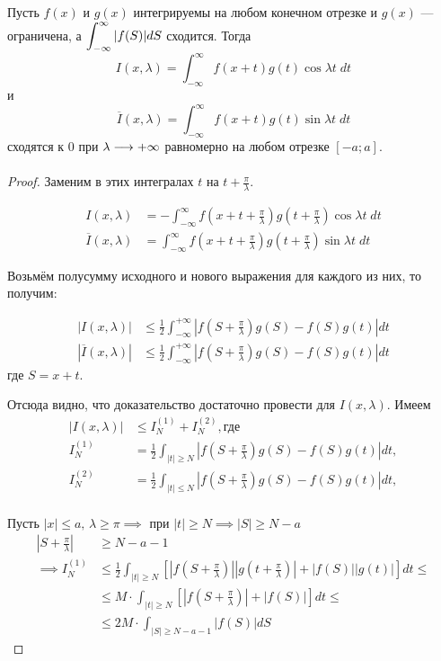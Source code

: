 \begin{theorem}[Лемма 2]
    Пусть $f(x)$ и $g(x)$ интегрируемы на любом конечном отрезке и $g(x)$ ---
    ограничена, а $\displaystyle\int_{-\infty}^\infty |f(S)| dS$ сходится. Тогда 
    \[ I(x, \lambda) = \int_{-\infty}^\infty f(x + t) g(t) \cos \lambda t \; dt \]
    и
    \[ \overline{I}(x, \lambda) = \int_{-\infty}^\infty f(x + t) g(t) \sin \lambda t \; dt \]
    сходятся к 0 при $\lambda \underset{}{\longrightarrow} +\infty$ равномерно на любом отрезке
    $[-a; a]$.
\end{theorem}
\begin{proof}
    Заменим в этих интегралах $t$ на $t + \frac{\pi}{\lambda}$.

    \begin{align*}
        I(x, \lambda) &= -\int_{-\infty}^\infty f(x + t + \frac{\pi}{\lambda}) g(t + \frac{\pi}{\lambda}) \cos \lambda t \; dt \\
        \overline{I}(x, \lambda) &= \int_{-\infty}^\infty f(x + t + \frac{\pi}{\lambda}) g(t + \frac{\pi}{\lambda}) \sin \lambda t \; dt
    \end{align*}

    Возьмём полусумму исходного и нового выражения для каждого из них, то
    получим:

    \begin{align*}
        |I(x, \lambda)| &\leq \frac{1}{2} \int_{-\infty}^{+\infty} \left| f(S + \frac{\pi}{\lambda}) g(S) - f(S)g(t) \right| dt \\
        |\overline{I}(x, \lambda)| &\leq \frac{1}{2} \int_{-\infty}^{+\infty} \left| f(S + \frac{\pi}{\lambda}) g(S) - f(S)g(t) \right| dt
    \end{align*} где $S = x + t$.

    Отсюда видно, что доказательство достаточно провести для $I(x, \lambda)$.
    Имеем \begin{align*}
        |I(x, \lambda)| &\leq I_N^{(1)} + I_N^{(2)}, \text{где} \\
        I_N^{(1)} &= \frac{1}{2} \int_{|t| \geq N} \left|f(S + \frac{\pi}{\lambda})g(S) - f(S)g(t)\right| dt, \\
        I_N^{(2)} &= \frac{1}{2} \int_{|t| \leq N} \left|f(S + \frac{\pi}{\lambda})g(S) - f(S)g(t)\right| dt, \\
    \end{align*}

    Пусть $|x| \leq a, \, \lambda \geq \pi \implies$ при $|t| \geq N \implies
    |S| \geq N - a$ 
    \begin{align*}
        \left| S + \frac{\pi}{\lambda} \right| &\geq N - a - 1 \\
        \implies I_N^{(1)} &\leq \frac{1}{2} \int_{|t| \geq N} 
        \left[ \left| f(S + \frac{\pi}{\lambda}) \right|
               \left| g(t + \frac{\pi}{\lambda}) \right| +
               |f(S)| |g(t)| \right] dt \leq \\
        &\leq M \cdot \int_{|t| \geq N} \left[ \left| f(S + \frac{\pi}{\lambda}) \right| + |f(S)| \right] dt \leq \\
        &\leq 2 M \cdot \int_{|S| \geq N - a - 1} |f(S)| dS
    \end{align*}


\end{proof}
